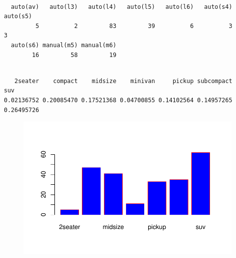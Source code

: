 \documentclass[
  letterpaper,
  DIV=11,
  numbers=noendperiod]{scrreprt}
\newenvironment{Shaded}{\begin{snugshade}}{\end{snugshade}}
\newcommand{\AttributeTok}[1]{\textcolor[rgb]{0.40,0.45,0.13}{#1}}
\newcommand{\FunctionTok}[1]{\textcolor[rgb]{0.28,0.35,0.67}{#1}}
\newcommand{\NormalTok}[1]{\textcolor[rgb]{0.00,0.23,0.31}{#1}}
\newcommand{\OtherTok}[1]{\textcolor[rgb]{0.00,0.23,0.31}{#1}}
\newcommand{\SpecialCharTok}[1]{\textcolor[rgb]{0.37,0.37,0.37}{#1}}
\newcommand{\StringTok}[1]{\textcolor[rgb]{0.13,0.47,0.30}{#1}}
\begin{document}
\begin{Shaded}
\end{Shaded}

\begin{verbatim}

  auto(av)   auto(l3)   auto(l4)   auto(l5)   auto(l6)   auto(s4)   auto(s5) 
         5          2         83         39          6          3          3 
  auto(s6) manual(m5) manual(m6) 
        16         58         19 
\end{verbatim}

\begin{Shaded}
\end{Shaded}

\begin{verbatim}

   2seater    compact    midsize    minivan     pickup subcompact        suv 
0.02136752 0.20085470 0.17521368 0.04700855 0.14102564 0.14957265 0.26495726 
\end{verbatim}

\begin{Shaded}
\end{Shaded}

\begin{figure}[H]

{\centering \includegraphics{data_analysis_files/figure-pdf/unnamed-chunk-3-1.pdf}

}

\end{figure}
\end{document}
